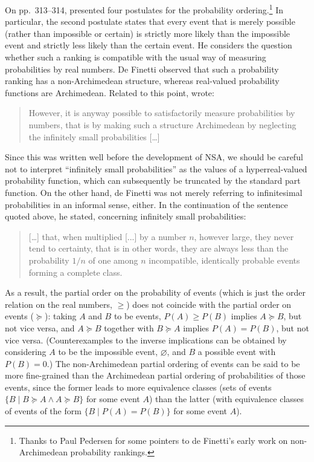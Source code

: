 On pp.~313--314, \citet[section~13]{deFinetti:1931} presented four postulates for the probability ordering.\footnote{Thanks to Paul Pedersen for some pointers to de Finetti's early work on non-Archimedean probability rankings.} In particular, the second postulate states that every event that is merely possible (rather than impossible or certain) is strictly more likely than the impossible event and strictly less likely than the certain event. He considers the question whether such a ranking is compatible with the usual way of measuring probabilities by real numbers. De Finetti observed that such a probability ranking has a non-Archimedean structure, whereas real-valued probability functions are Archimedean. Related to this point, \citet[p.~316]{deFinetti:1931} wrote:
\begin{quote}
However, it is anyway possible to satisfactorily measure probabilities by numbers, that is by making such a structure Archimedean by neglecting the infinitely small probabilities [\ldots]
\end{quote}
Since this was written well before the development of NSA, we should be careful not to interpret ``infinitely small probabilities'' as the values of a hyperreal-valued probability function, which can subsequently be truncated by the standard part function. On the other hand, de Finetti was not merely referring to infinitesimal probabilities in an informal sense, either. In the continuation of the sentence quoted above, he stated, concerning infinitely small probabilities:
\begin{quote}
[\ldots] that, when multiplied [...] by a number $n$, however large, they never tend to certainty, that is in other words, they are always less than the probability $1/n$ of one among $n$ incompatible, identically probable events forming a complete class.
\end{quote}
As a result, the partial order on the probability of events (which is just the order relation on the real numbers, $\geq$) does not coincide with the partial order on events ($\succeq$): taking $A$ and $B$ to be events, $P(A) \geq P(B)$ implies $A \succeq B$, but not vice versa, and $A \succeq B$ together with $B \succeq A$ implies $P(A) = P(B)$, but not vice versa. (Counterexamples to the inverse implications can be obtained by considering $A$ to be the impossible event, $\varnothing$, and $B$ a possible event with $P(B)=0$.) The non-Archimedean partial ordering of events can be said to be more fine-grained than the Archimedean partial ordering of probabilities of those events, since the former leads to more equivalence classes (sets of events $\{B \mid B \succeq A \wedge A \succeq B \}$ for some event $A$) than the latter (with equivalence classes of events of the form $\{B \mid P(A) = P(B) \}$ for some event $A$).

